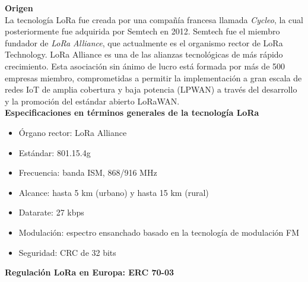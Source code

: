 \documentclass[12pt]{article}
\begin{document}
	\noindent \textbf{Origen} \\
	
	\noindent La tecnología LoRa fue creada por una compañía francesa llamada \textit{Cycleo}, la cual posteriormente fue adquirida por Semtech en 2012. Semtech fue el miembro fundador de \textit{LoRa Alliance}, que actualmente es el organismo rector de LoRa Technology. LoRa Alliance es una de las alianzas tecnológicas de más rápido crecimiento. Esta asociación sin ánimo de lucro está formada por más de 500 empresas miembro, comprometidas a permitir la implementación a gran escala de redes IoT de amplia cobertura y baja potencia (LPWAN) a través del desarrollo y la promoción del estándar abierto LoRaWAN.\\
	
	\noindent \textbf{Especificaciones en términos generales de la tecnología LoRa}
	
	\begin{itemize}
		\item Órgano rector: LoRa Alliance
		\item Estándar: 801.15.4g
		\item Frecuencia: banda ISM, 868/916 MHz
		\item Alcance: hasta 5 km (urbano) y hasta 15 km (rural)
		\item Datarate: 27 kbps
		\item Modulación: espectro ensanchado basado en la tecnología de modulación FM
		\item Seguridad: CRC de 32 bits
	\end{itemize}
	 
	 
	
	\noindent  \textbf{Regulación LoRa en Europa: ERC 70-03} \\
	
\end{document}
